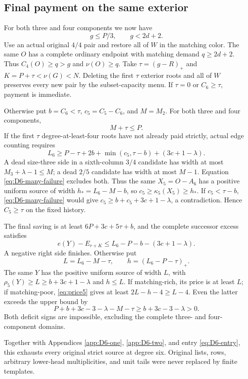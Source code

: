 \documentclass[11pt,a4paper]{article}
\theoremstyle{definition}
\begin{document}
\subsection{Final payment on the same exterior}
For both three and four components we now have
\[
 g\le P/3,\qquad g<2d+2.
\]
Use an actual original $4/4$ pair and restore all of $W$ in the matching color. The same $O$ has a complete ordinary endpoint with matching demand $q\ge2d+2$. Thus $C_4(O)\ge q>g$ and $\nu(O)\ge q$. Take $\tau=(g-R)_+$ and $K=P+\tau<\nu(G)<N$. Deleting the first $\tau$ exterior roots and all of $W$ preserves every new pair by the subset-capacity menu. If $\tau=0$ or $C_6\ge\tau$, payment is immediate.

Otherwise put $b=C_6<\tau$, $c_5=C_5-C_6$, and $M=M_2$. For both three and four components,
\[
 M+\tau\le P.
\]
If the first $\tau$ degree-at-least-four roots have not already paid strictly, actual edge counting requires
\begin{equation}\label{eq:D6-many-failure}
 L_6\ge P-\tau+2b+\min(c_5,\tau-b)+(3c+1-\lambda).
\end{equation}
A dead size-three side in a sixth-column $3/4$ candidate has width at most $M_3+\lambda-1\le M$; a dead $2/5$ candidate has width at most $M-1$. Equation \eqref{eq:D6-many-failure} excludes both. Thus the same $X_5=O-A_6$ has a positive uniform source of width $h_*=L_6-M-b$, so $c_5\ge\kappa_5(X_5)\ge h_*$. If $c_5<\tau-b$, \eqref{eq:D6-many-failure} would give $c_5\ge b+c_5+3c+1-\lambda$, a contradiction. Hence $C_5\ge\tau$ on the fixed history.

The final saving is at least $6P+3c+5\tau+b$, and the complete successor excess satisfies
\[
 e(Y)-E_{r+K}\le L_6-P-b-(3c+1-\lambda).
\]
A negative right side finishes. Otherwise put
\[
 L=L_6-M-\tau,\qquad h=(L_6-P-\tau)_+.
\]
The same $Y$ has the positive uniform source of width $L$, with
$\rho_5(Y)\ge L\ge b+3c+1-\lambda$ and $h\le L$. If matching-rich, its price is at least $L$; if matching-poor, \eqref{eq:price5} gives at least $2L-h-4\ge L-4$. Even the latter exceeds the upper bound by
\[
 P+b+3c-3-\lambda-M-\tau
 \ge b+3c-3-\lambda>0.
\]
Both deficit signs are impossible, excluding the complete three- and four-component domains.

Together with Appendices \ref{app:D6-one}, \ref{app:D6-two}, and entry \eqref{eq:D6-entry}, this exhausts every original strict source at degree six. Original lists, rows, arbitrary lower-head multiplicities, and unit tails were never replaced by finite templates.
\end{document}
